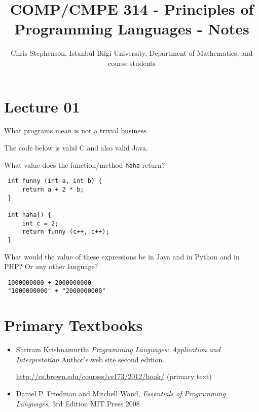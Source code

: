 \documentclass{article}
\begin{document}
\title{COMP/CMPE 314 - Principles of Programming Languages - Notes}
\author{Chris Stephenson, Istanbul Bilgi University, Department of Mathematics, and course students}
\maketitle

\section{Lecture 01}
What programs mean is not a trivial business.

The code below is valid C and also valid Java.

What value does the function/method \verb|haha| return?

\begin{verbatim}
 int funny (int a, int b) {
     return a + 2 * b;
 }
 
 int haha() {
     int c = 2;
     return funny (c++, c++);
 }
\end{verbatim}

What would the value of these expressions be in Java and in Python and in PHP? Or any other language?
\begin{verbatim}
 1000000000 + 2000000000
 "1000000000" + "2000000000"
\end{verbatim}



\section*{Primary Textbooks}
\begin{itemize}


\item Shriram Krishnamurthi \emph{Programming Languages: Application and Interpretation} Author's web site  second edition. 

\url{http://cs.brown.edu/courses/cs173/2012/book/} (primary text)

\item Daniel P. Friedman and Mitchell Wand, \emph{Essentials of Programming Languages}, 3rd Edition MIT Press 2008
\end{itemize}
\end{document}

